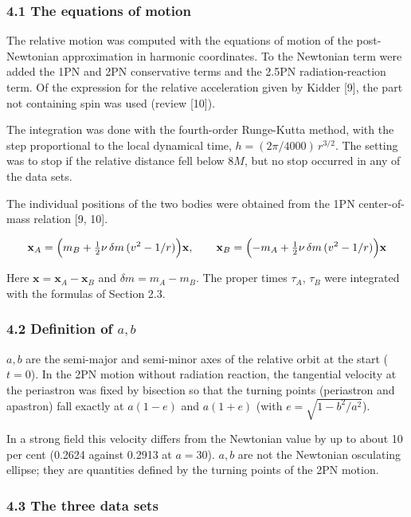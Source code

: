 \documentclass[
  a4paper,
]{article}
\begin{document}
\subsubsection{4.1 The equations of
motion}\label{the-equations-of-motion}

The relative motion was computed with the equations of motion of the
post-Newtonian approximation in harmonic coordinates. To the Newtonian
term were added the 1PN and 2PN conservative terms and the 2.5PN
radiation-reaction term. Of the expression for the relative acceleration
given by Kidder {[}9{]}, the part not containing spin was used (review
{[}10{]}).

The integration was done with the fourth-order Runge-Kutta method, with
the step proportional to the local dynamical time,
\(h=(2\pi/4000)\,r^{3/2}\). The setting was to stop if the relative
distance fell below \(8M\), but no stop occurred in any of the data
sets.

The individual positions of the two bodies were obtained from the 1PN
center-of-mass relation {[}9, 10{]}.

\[
\mathbf x_A=\Bigl(m_B+\tfrac12\nu\,\delta m\,(v^2-1/r)\Bigr)\mathbf x,\qquad
\mathbf x_B=\Bigl(-m_A+\tfrac12\nu\,\delta m\,(v^2-1/r)\Bigr)\mathbf x
\]

Here \(\mathbf x=\mathbf x_A-\mathbf x_B\) and \(\delta m=m_A-m_B\). The
proper times \(\tau_A\), \(\tau_B\) were integrated with the formulas of
Section 2.3.

\subsubsection{\texorpdfstring{4.2 Definition of
\(a, b\)}{4.2 Definition of a, b}}\label{definition-of-a-b}

\(a, b\) are the semi-major and semi-minor axes of the relative orbit at
the start (\(t=0\)). In the 2PN motion without radiation reaction, the
tangential velocity at the periastron was fixed by bisection so that the
turning points (periastron and apastron) fall exactly at \(a(1-e)\) and
\(a(1+e)\) (with \(e=\sqrt{1-b^2/a^2}\)).

In a strong field this velocity differs from the Newtonian value by up
to about 10 per cent (0.2624 against 0.2913 at \(a=30\)). \(a, b\) are
not the Newtonian osculating ellipse; they are quantities defined by the
turning points of the 2PN motion.

\subsubsection{4.3 The three data sets}\label{the-three-data-sets}
\end{document}
